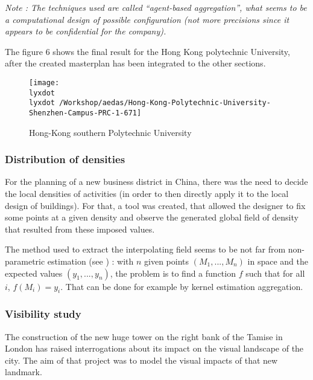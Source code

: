 \documentclass[english]{article}
\newcommand{\lyxdot}{.}
\begin{document}
\bigskip{}


\textit{Note : The techniques used are called ``agent-based aggregation'',
what seems to be a computational design of possible configuration
(not more precisions since it appears to be confidential for the company).}

\bigskip{}


The figure 6 shows the final result for the Hong Kong polytechnic
University, after the created masterplan has been integrated to the
other sections.

\begin{figure}
\hfill{}\texttt{[image: \\lyxdot \\lyxdot /Workshop/aedas/Hong-Kong-Polytechnic-University-Shenzhen-Campus-PRC-1-671]}\hfill{}\hfill{}\caption{Hong-Kong southern Polytechnic University}


\end{figure}



\subsubsection*{Distribution of densities}

For the planning of a new business district in China, there was the
need to decide the local densities of activities (in order to then
directly apply it to the local design of buildings). For that, a tool
was created, that allowed the designer to fix some points at a given
density and observe the generated global field of density that resulted
from these imposed values.

\bigskip{}


The method used to extract the interpolating field seems to be not
far from non-parametric estimation (see \cite{tsybakov2004introduction})
: with $n$ given points $(M_{1},...,M_{n})$ in space and the expected
values $(y_{1},...,y_{n})$, the problem is to find a function $f$
such that for all $i$, $f(M_{i})=y_{i}$. That can be done for example
by kernel estimation aggregation.


\subsubsection*{Visibility study}

The construction of the new huge tower on the right bank of the Tamise
in London has raised interrogations about its impact on the visual
landscape of the city. The aim of that project was to model the visual
impacts of that new landmark.
\end{document}
